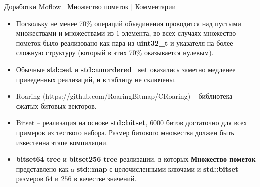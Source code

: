 \documentclass[10pt]{beamer}
\begin{document}
\begin{frame}{Доработки Moflow | Множество пометок | Комментарии }

\begin{itemize}
  \item Поскольку не менее 70\% операций объединения проводится над пустыми множествами и множествами из $1$ элемента, во всех случаях множество пометок было реализовано как пара из \textbf{uint32\_t} и указателя на более сложную структуру (который в этих 70\% оказывается нулевым).
  \item Обычные \textbf{std::set} и \textbf{std::unordered\_set} оказались заметно медленее приведенных реализаций, и в таблицу не сключены.
  \item Roaring (https://github.com/RoaringBitmap/CRoaring) -- библиотека сжатых битовых векторов.
\item Bitset -- реализация на основе \textbf{std::bitset}, $6000$ битов достаточно для всех примеров из тествого набора. Размер битового множества должен быть известенна этапе компиляции.
\item \textbf{bitset64 tree} и \textbf{bitset256 tree} реализации, в которых \textbf{Множество пометок} представлено как a \textbf{std::map} с целочисленными ключами и \textbf{std::bitset} размеров $64$ и $256$ в качестве значений.
\end{itemize}
\end{frame}


\appendix
\end{document}
